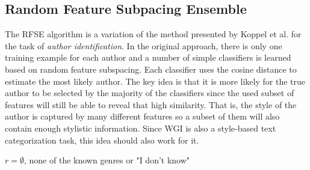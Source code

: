 \subsection{Random Feature Subpacing Ensemble}\label{chap:openset:sec:RFSE_Description}

The RFSE algorithm is a variation of the method presented by Koppel et al.  for the task of \textit{author identification}. In the original approach, there is only one training example for each author and a number of simple classifiers is learned based on random feature subspacing. Each classifier uses the cosine distance to estimate the most likely author. The key idea is that it is more likely for the true author to be selected by the majority of the classifiers since the used subset of features will still be able to reveal that high similarity. That is, the style of the author is captured by many different features so a subset of them will also contain enough stylistic information. Since WGI is also a style-based text categorization task, this idea should also work for it.

\hfill \break

\begin{algorithm}[H]
\caption{The \textit{RFSE} algorithm.}\label{alg:RFS-Ensemble}

{
      $r = \emptyset$, none of the known genres or "I don't know"\;
}
\end{algorithm}

